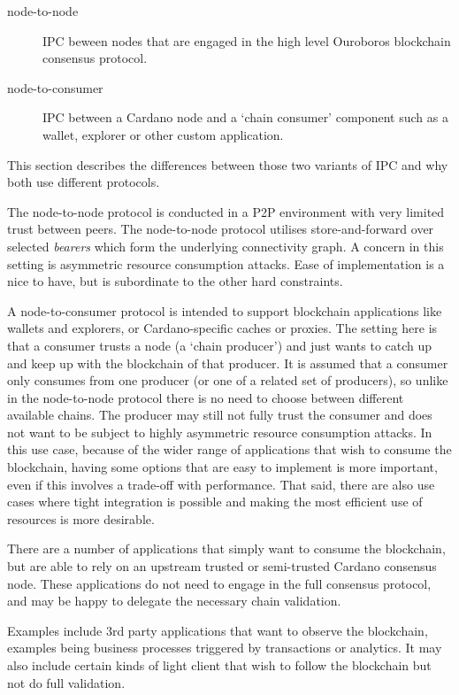 \documentclass{report}
\theoremstyle{definition}{
  \newtheorem{lemma}{Lemma}[section] %
  \newtheorem{definition}[lemma]{Definition}
}
\theoremstyle{theorem}{
  \newtheorem{invariant}[lemma]{Invariant}
  \newtheorem{proofobligation}[lemma]{Proof Obligation}
}
\numberwithin{equation}{lemma}
\begin{document}
\begin{description}
\item[node-to-node] IPC beween nodes that are engaged in the high level Ouroboros
      blockchain consensus protocol.
\item[node-to-consumer] IPC between a Cardano node and a `chain consumer' component such as a
      wallet, explorer or other custom application.
\end{description}

This section describes the differences between those two variants of IPC and why both use
different protocols.

The node-to-node protocol is conducted in a P2P environment
with very limited trust between peers. The node-to-node protocol utilises
store-and-forward over selected \emph{bearers} which form the underlying
connectivity graph. A concern in this setting is asymmetric resource consumption
attacks. Ease of implementation is a nice to have, but is subordinate to the
other hard constraints.

A node-to-consumer protocol is intended to support blockchain applications
like wallets and explorers, or Cardano-specific caches or proxies. The setting
here is that a consumer trusts a node (a `chain producer') and just wants to
catch up and keep up with the blockchain of that producer. It is assumed that
a consumer only consumes from one producer (or one of a related set of
producers), so unlike in the node-to-node protocol there is no need to choose
between different available chains. The producer may still not fully trust the
consumer and does not want to be subject to highly asymmetric resource
consumption attacks. In this use case, because of the wider range of
applications that wish to consume the blockchain, having some options that are
easy to implement is more important, even if this involves a trade-off with
performance. That said, there are also use cases where tight integration is
possible and making the most efficient use of resources is more desirable.

There are a number of applications that simply want to consume the blockchain,
but are able to rely on an upstream trusted or semi-trusted Cardano consensus
node. These applications do not need to engage in the full consensus protocol,
and may be happy to delegate the necessary chain validation.

Examples include 3rd party applications that want to observe the blockchain,
examples being business processes triggered by transactions or analytics.  It
may also include certain kinds of light client that wish to follow the
blockchain but not do full validation.
\end{document}
